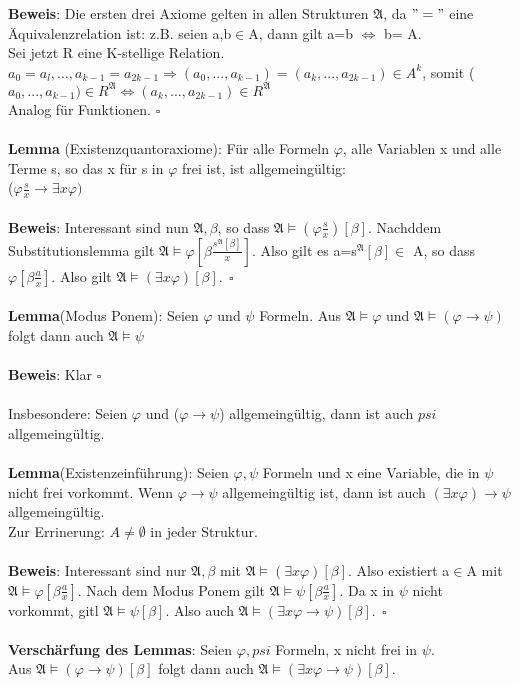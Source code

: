 \documentclass[a4paper]{scrartcl}
\begin{document}
\textbf{Beweis}: Die ersten drei Axiome gelten in allen Strukturen $\mathfrak{A}$, da $"="$ eine Äquivalenzrelation ist: z.B. seien a,b$\in$A, dann gilt a=b $\Leftrightarrow$ b= A.\\
Sei jetzt R eine K-stellige Relation.\\
$a_0=a_l,...,a_{k-1}=a_{2k-1} \Rightarrow (a_0,...,a_{k-1})=(a_k,...,a_{2k-1}) \in A^k$, somit ($a_0,...,a_{k-1})\in R^\mathfrak{A} \Leftrightarrow (a_k,...,a_{2k-1})\in R^\mathfrak{A}$\\
Analog für Funktionen. $\square$\\ \\
\textbf{Lemma} (Existenzquantoraxiome): Für alle Formeln $\varphi$, alle Variablen x und alle Terme s, so das x für s in $\varphi$ frei ist, ist allgemeingültig:\\
($\varphi\frac{s}{x}\rightarrow \exists x\varphi)$\\ \\
\textbf{Beweis}: Interessant sind nun $\mathfrak{A},\beta$, so dass $\mathfrak{A} \models (\varphi\frac{s}{x})[\beta]$. Nachddem Substitutionslemma gilt $\mathfrak{A}\models\varphi[\beta\frac{s^\mathfrak{A}[\beta]}{x}]$. Also gilt es a=s$^\mathfrak{A}[\beta]\in$ A, so dass $\varphi[\beta\frac{a}{x}]$. Also gilt $\mathfrak{A}\models(\exists x\varphi)[\beta].~~\square$\\ \\
\textbf{Lemma}(Modus Ponem): Seien $\varphi$ und $\psi$ Formeln. Aus $\mathfrak{A}\models\varphi$ und $\mathfrak{A}\models (\varphi \rightarrow \psi)$ folgt dann auch $\mathfrak{A}\models \psi$ \\ \\
\textbf{Beweis}: Klar $\square$\\ \\
Insbesondere: Seien $\varphi$ und ($\varphi\to \psi$) allgemeingültig, dann ist auch $psi$ allgemeingültig.\\ \\
\textbf{Lemma}(Existenzeinführung): Seien $\varphi,\psi$ Formeln und x eine Variable, die in $\psi$ nicht frei vorkommt. Wenn $\varphi \to \psi$ allgemeingültig ist, dann ist auch $(\exists x\varphi) \to \psi$ allgemeingültig.\\
Zur Errinerung: $A\neq \emptyset$ in jeder Struktur.\\ \\
\textbf{Beweis}: Interessant sind nur $\mathfrak{A},\beta$ mit $\mathfrak{A}\models (\exists x\varphi)[\beta]$. Also existiert a$\in$A mit $\mathfrak{A}\models \varphi[\beta\frac{a}{x}]$. Nach dem Modus Ponem gilt $\mathfrak{A}\models \psi [\beta\frac{a}{x}]$. Da x in $\psi$ nicht vorkommt, gitl $\mathfrak{A}\models \psi [\beta]$. Also auch $\mathfrak{A}\models(\exists x\varphi \rightarrow \psi)[\beta].~~\square$\\ \\
\textbf{Verschärfung des Lemmas}: Seien $\varphi, psi $ Formeln, x nicht frei in $\psi$.\\
Aus $\mathfrak{A}\models (\varphi \rightarrow  \psi)[\beta]$ folgt dann auch $\mathfrak{A} \models(\exists x\varphi \to \psi)[\beta]$.
\end{document}
